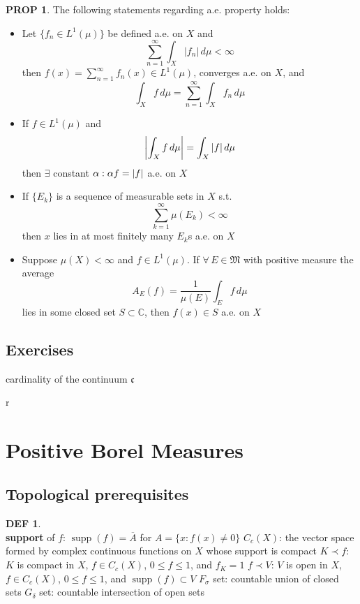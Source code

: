 \documentclass[hidelinks,10pt]{article}
\theoremstyle{definition}
\newtheorem*{defin}{DEF}
\theoremstyle{dotles}
\newenvironment{exercise}[1]
  {\renewcommand\theinnercustomex{#1}\innercustomex}
  {\endinnercustomex}
\theoremstyle{dotless}
\newtheorem{proposition}{PROP}[section]
\theoremstyle{remark}
\DeclareMathOperator\supp{supp}
\begin{document}
\begin{proposition}
The following statements regarding a.e. property holds:\begin{itemize}
    \item Let $\{f_n\in L^1(\mu)\}$ be defined a.e. on $X$ and
    \[\sum_{n=1}^\infty\int_X|f_n|\,d\mu<\infty\]
    then $f(x)=\sum_{n=1}^\infty f_n(x)\in L^1(\mu)$, converges a.e. on $X$, and
    \[\int_Xf\,d\mu=\sum_{n=1}^\infty\int_Xf_n\,d\mu\]
    \item If $f\in L^1(\mu)$ and
    \[\abs{\int_Xf\,d\mu}=\int_X\abs{f}\,d\mu\]
    then $\exists$ constant $\alpha:\alpha f=\abs{f}$ a.e. on $X$
    \item If $\{E_k\}$ is a sequence of measurable sets in $X$ s.t.
    \[\sum_{k=1}^\infty\mu(E_k)<\infty\]
    then $x$ lies in at most finitely many $E_k$s a.e. on $X$
    \item Suppose $\mu(X)<\infty$ and $f\in L^1(\mu)$. If $\forall\,E\in\mathfrak{M}$ with positive measure the average
    \[A_E(f)=\frac{1}{\mu(E)}\int_Ef\,d\mu\]
    lies in some closed set $S\subset\mathbb{C}$, then $f(x)\in S$ a.e. on $X$
\end{itemize}
\end{proposition}

\subsection*{Exercises}

\begin{exercise}{1.1}
cardinality of the continuum $\mathfrak{c}$
\end{exercise}

\begin{exercise}{1.2}
r
\end{exercise}

\newpage

\section{Positive Borel Measures}

\subsection{Topological prerequisites}

\begin{defin}~\\
\textbf{support} of $f$: $\supp(f)=\overline{A}$ for $A=\{x:f(x)\neq0\}$\newline
$C_c(X)$: the vector space formed by complex continuous functions on $X$ whose support is compact\bigbreak
$K\prec f$: $K$ is compact in $X$, $f\in C_c(X)$, $0\leq f\leq1$, and $f_K=1$\newline
$f\prec V$: $V$ is open in $X$, $f\in C_c(X)$, $0\leq f\leq1$, and $\supp(f)\subset V$\bigbreak
$F_\sigma$ set: countable union of closed sets\newline
$G_\delta$ set: countable intersection of open sets
\end{defin}
\end{document}
